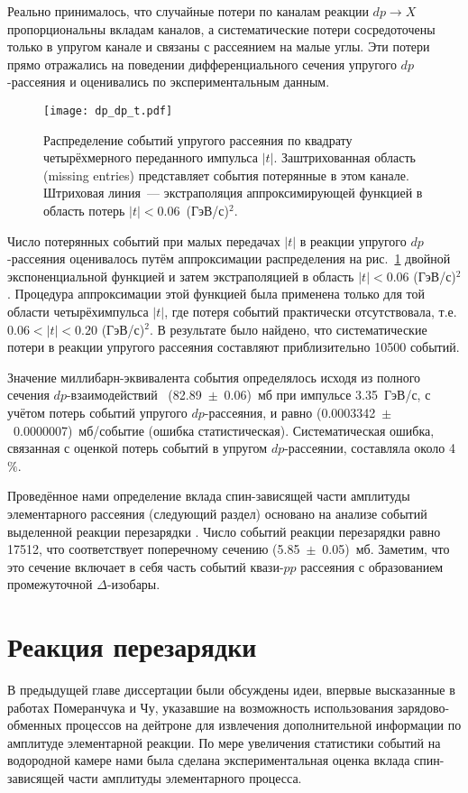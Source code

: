Реально принималось, что случайные потери по каналам реакции $dp \rightarrow X$
пропорциональны вкладам каналов, а систематические потери сосредоточены только в
упругом канале \dpela и связаны с рассеянием на малые углы. Эти потери прямо
отражались на поведении дифференциального сечения упругого $dp$-рассеяния и
оценивались по экспериментальным данным.

\begin{figure}[h]
  \centering
  \texttt{[image: dp\_dp\_t.pdf]}
  \caption{Распределение событий упругого рассеяния \dpela по квадрату
    четырёхмерного переданного импульса $|t|$. Заштрихованная область (missing
    entries) представляет события потерянные в этом канале. Штриховая линия~---
    экстраполяция аппроксимирующей функцией в область потерь
    $|t| < 0.06$~(ГэВ/с)$^2$.}
  \label{fig:dp_dp_t}
\end{figure}

Число потерянных событий при малых передачах $|t|$ в реакции упругого
$dp$-рассеяния оценивалось путём аппроксимации распределения на
рис.~\ref{fig:dp_dp_t} двойной экспоненциальной функцией и затем экстраполяцией
в область $|t| < 0.06$ (ГэВ/с)$^2$. Процедура аппроксимации этой функцией была
применена только для той области четырёхимпульса $|t|$, где потеря событий
практически отсутствовала, т.е. $0.06 < |t| < 0.20$ (ГэВ/с)$^2$. В результате
было найдено, что систематические потери в реакции упругого рассеяния \dpela
составляют приблизительно 10500 событий.

Значение миллибарн-эквивалента события определялось исходя из полного сечения
$dp$-взаимодействий~\cite{bugg66} (82.89~$\pm$~0.06)~мб при импульсе 3.35~ГэВ/с,
с учётом потерь событий упругого $dp$-рассеяния, и равно
(0.0003342~$\pm$~0.0000007)~мб/событие (ошибка статистическая). Систематическая
ошибка, связанная с оценкой потерь событий в упругом $dp$-рассеянии, составляла
около 4~$\%$.

Проведённое нами определение вклада спин-зависящей части амплитуды элементарного
\np рассеяния (следующий раздел) основано на анализе событий выделенной реакции
перезарядки \dpchex. Число событий реакции перезарядки равно 17512, что
соответствует поперечному сечению (5.85~$\pm$~0.05)~мб. Заметим, что это сечение
включает в себя часть событий квази-$pp$ рассеяния с образованием промежуточной
$\Delta$-изобары.

\section{Реакция перезарядки \maybebm{{\dpchex}}}
В предыдущей главе диссертации были обсуждены идеи, впервые высказанные в
работах Померанчука и Чу, указавшие на возможность использования
зарядово-обменных процессов на дейтроне для извлечения дополнительной информации
по амплитуде элементарной \np реакции. По мере увеличения статистики событий на
водородной камере нами была сделана экспериментальная оценка вклада
спин-зависящей части амплитуды элементарного \np процесса.


